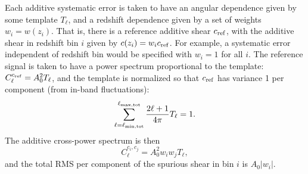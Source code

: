 \documentclass[aps,prd, amsmath,amssymb,superscriptaddress,showkeys,nofootinbib,reprint,preprintnumbers]{revtex4-1}
\begin{document}
\begin{widetext}
\begin{table}
\caption{The bands used for the additive systematic errors. There are $N_{\rm band}=5$ bands ranging over a total signal band from $\ell_{\rm min,tot}=10$ to $\ell_{\rm max,tot}=3161$. The fraction of the error budget allocated to each band is also indicated, as are the maximum allowed redshift-independent spurious shear ($A_0^{\rm flat}(\alpha)$, RMS per component), and the maximum scaling factors for redshift dependence, $S_{\rm max,\pm}(\alpha)$ and $S_{\rm max,+}(\alpha)$.
\label{tab:addbands}}
\end{table}

Each additive systematic error is taken to have an angular dependence
given by some template $T_\ell$, and a redshift dependence given by a
set of weights $w_i=w(z_i)$. That is, there is a reference additive
shear $c_{\rm ref}$, with the additive shear in redshift bin $i$ given
by $c(z_i) = w_ic_{\rm ref}$. For example, a systematic error
independent of redshift bin would be specified with $w_i=1$ for all
$i$. The reference signal is taken to have a power spectrum
proportional to the template: $C_\ell^{c_{\rm ref}} = A_0^2T_\ell$,
and the template is normalized so that $c_{\rm ref}$ has variance 1
per component (from in-band fluctuations):
\begin{equation}
\sum_{\ell=\ell_{\rm min,tot}}^{\ell_{\rm max,tot}} \frac{2\ell+1}{4\pi} T_\ell = 1.
\label{eq:Tlsum}
\end{equation}
The additive cross-power spectrum is then
\begin{equation}
C_\ell^{c_i,c_j} = A_0^2 w_iw_jT_\ell,
\end{equation}
and the total RMS per component of the spurious shear in bin $i$ is $A_0|w_i|$.


\end{widetext}
\end{document}
